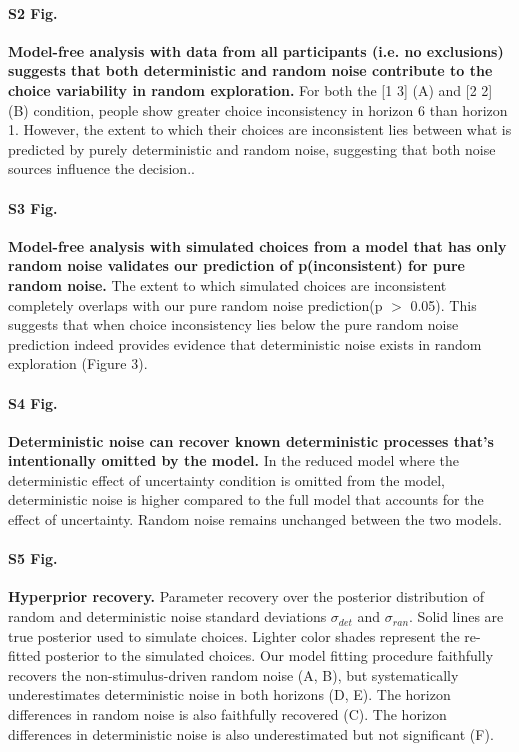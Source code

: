 \documentclass[12pt]{article}
\begin{document}
{\paragraph*{S2 Fig.}
\label{S2_Fig}
{\bf Model-free analysis with data from all participants (i.e. no exclusions) suggests that both deterministic and random noise contribute to the choice variability in random exploration. } For both the [1 3] (A) and [2 2] (B) condition, people show greater choice inconsistency in horizon 6 than horizon 1. However, the extent to which their choices are inconsistent lies between what is predicted by purely deterministic and random noise, suggesting that both noise sources influence the decision..

\paragraph*{S3 Fig.}
\label{S3_Fig}
{\bf Model-free analysis with simulated choices from a model that has only random noise validates our prediction of p(inconsistent) for pure random noise.} The extent to which simulated choices are inconsistent completely overlaps with our pure random noise prediction(p $>$ 0.05). This suggests that when choice inconsistency lies below the pure random noise prediction indeed provides evidence that deterministic noise exists in random exploration (Figure 3).

\paragraph*{S4 Fig.}
\label{S4_Fig}
{\bf Deterministic noise can recover known deterministic processes that's intentionally omitted by the model.} In the reduced model where the deterministic effect of uncertainty condition is omitted from the model, deterministic noise is higher compared to the full model that accounts for the effect of uncertainty. Random noise remains unchanged between the two models.

\paragraph*{S5 Fig.}
\label{S5_Fig}
{\bf Hyperprior recovery.}
Parameter recovery over the posterior distribution of random and deterministic noise standard deviations $\sigma_{det}$ and $\sigma_{ran}$. Solid lines are true posterior used to simulate choices. Lighter color shades represent the re-fitted posterior to the simulated choices. Our model fitting procedure faithfully recovers the non-stimulus-driven random noise (A, B), but systematically underestimates deterministic noise in both horizons (D, E). The horizon differences in random noise is also faithfully recovered (C). The horizon differences in deterministic noise is also underestimated but not significant (F).

}
\end{document}
